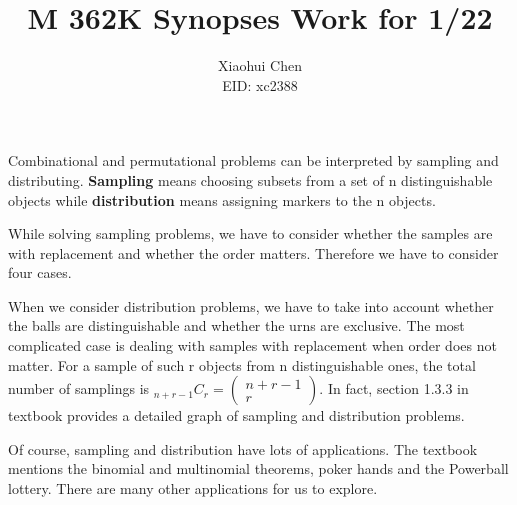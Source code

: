 \documentclass[12pt]{article}
\author{Xiaohui Chen \\EID: xc2388}
\title{M 362K Synopses Work for 1/22}
\begin{document}
\maketitle
\begin{spacing}{2.0}

Combinational and permutational problems can be interpreted by sampling and distributing. \textbf{Sampling} means choosing subsets from a set of n distinguishable objects while \textbf{distribution} means assigning markers to the n objects.

While solving sampling problems, we have to consider whether the samples are with replacement and whether the order matters. Therefore we have to consider four cases.

When we consider distribution problems, we have to take into account whether the balls are distinguishable and whether the urns are exclusive. The most complicated case is dealing with samples with replacement when order does not matter. For a sample of such r objects from n distinguishable ones, the total number of samplings is ${}_{n+r-1}C_{r}=\left(
\begin{array}{c}
n+r-1 \\
r
\end{array}
\right)$. In fact, section 1.3.3 in textbook provides a detailed graph of sampling and distribution problems.

Of course, sampling and distribution have lots of applications. The textbook mentions the binomial and multinomial theorems, poker hands and the Powerball lottery. There are many other applications for us to explore.


\end{spacing}
\end{document}
